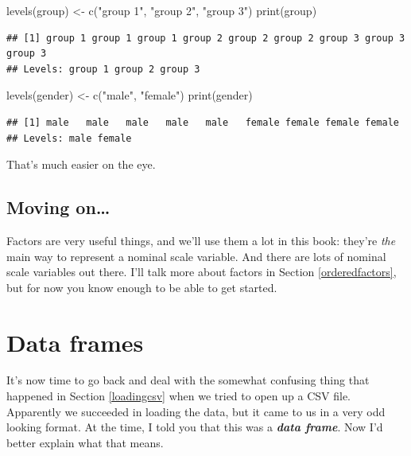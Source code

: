 \documentclass[
]{book}
\newenvironment{Shaded}{\begin{snugshade}}{\end{snugshade}}
\newcommand{\FunctionTok}[1]{\textcolor[rgb]{0.00,0.00,0.00}{#1}}
\newcommand{\NormalTok}[1]{#1}
\newcommand{\OtherTok}[1]{\textcolor[rgb]{0.56,0.35,0.01}{#1}}
\newcommand{\StringTok}[1]{\textcolor[rgb]{0.31,0.60,0.02}{#1}}
\begin{document}
\begin{Shaded}
\begin{Highlighting}[]
\FunctionTok{levels}\NormalTok{(group) }\OtherTok{\textless{}{-}} \FunctionTok{c}\NormalTok{(}\StringTok{"group 1"}\NormalTok{, }\StringTok{"group 2"}\NormalTok{, }\StringTok{"group 3"}\NormalTok{)}
\FunctionTok{print}\NormalTok{(group)}
\end{Highlighting}
\end{Shaded}

\begin{verbatim}
## [1] group 1 group 1 group 1 group 2 group 2 group 2 group 3 group 3 group 3
## Levels: group 1 group 2 group 3
\end{verbatim}

\begin{Shaded}
\begin{Highlighting}[]
\FunctionTok{levels}\NormalTok{(gender) }\OtherTok{\textless{}{-}} \FunctionTok{c}\NormalTok{(}\StringTok{"male"}\NormalTok{, }\StringTok{"female"}\NormalTok{)}
\FunctionTok{print}\NormalTok{(gender)}
\end{Highlighting}
\end{Shaded}

\begin{verbatim}
## [1] male   male   male   male   male   female female female female
## Levels: male female
\end{verbatim}

That's much easier on the eye.

\hypertarget{moving-on}{%
\subsection{Moving on\ldots{}}\label{moving-on}}

Factors are very useful things, and we'll use them a lot in this book: they're \emph{the} main way to represent a nominal scale variable. And there are lots of nominal scale variables out there. I'll talk more about factors in Section \ref{orderedfactors}, but for now you know enough to be able to get started.

\hypertarget{dataframes}{%
\section{Data frames}\label{dataframes}}

It's now time to go back and deal with the somewhat confusing thing that happened in Section \ref{loadingcsv} when we tried to open up a CSV file. Apparently we succeeded in loading the data, but it came to us in a very odd looking format. At the time, I told you that this was a \textbf{\emph{data frame}}. Now I'd better explain what that means.
\end{document}
